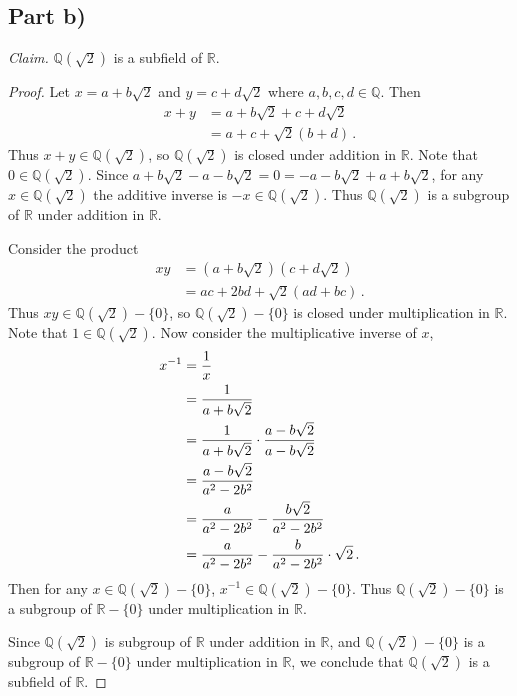\documentclass{abrice}
\newcommand{\R}{\mathbb{R}}
\newcommand{\Q}{\mathbb{Q}}
\begin{document}
\subsection{Part b)}

\emph{Claim.} $\Q(\sqrt 2)$ is a subfield of $\R$.

\begin{proof}
  Let $x = a + b \sqrt 2$ and $y = c + d \sqrt 2$ where $a,b,c,d \in \Q$. Then
  \begin{align*}
    x + y
    &= a + b \sqrt 2 + c + d \sqrt 2 \\
    &= a + c + \sqrt 2 (b + d)\, .
  \end{align*}
  Thus $x + y \in \Q(\sqrt 2)$, so $\Q(\sqrt 2)$ is closed under addition in
  $\R$. Note that $0 \in \Q(\sqrt 2)$. Since $a + b \sqrt 2 - a -b \sqrt 2 = 0 =
  -a - b \sqrt 2 + a + b \sqrt 2$, for any $x \in \Q(\sqrt 2)$ the additive
  inverse is $-x \in \Q(\sqrt 2)$. Thus $\Q(\sqrt 2)$ is a subgroup of $\R$
  under addition in $\R$.

  Consider the product
  \begin{align*}
    xy
    &= (a + b \sqrt 2)(c + d \sqrt 2) \\
    &= ac + 2bd + \sqrt 2 (ad + bc)\, .
  \end{align*}
  Thus $xy \in \Q(\sqrt 2) - \{0\}$, so $\Q(\sqrt 2) - \{0\}$ is closed under
  multiplication in $\R$. Note that $1 \in \Q(\sqrt 2)$. Now consider the
  multiplicative inverse of $x$,
  \begin{align*}
    x^{-1}
    &= {1 \over x} \\
    &= {1 \over a + b \sqrt 2} \\
    &= {1 \over a + b \sqrt 2} \cdot {a - b \sqrt 2 \over a - b \sqrt 2} \\
    &= {a - b \sqrt 2 \over a^2 - 2b^2} \\
    &= {a \over a^2 - 2b^2} - {b \sqrt 2 \over a^2 - 2b^2} \\
    &= {a \over a^2 - 2b^2} - {b \over a^2 - 2b^2} \cdot \sqrt 2\, .
  \end{align*}
  Then for any $x \in \Q(\sqrt 2) - \{0\}$, $x^{-1} \in \Q(\sqrt 2) - \{0\}$.
  Thus $\Q(\sqrt 2) - \{0\}$ is a subgroup of $\R - \{0\}$ under multiplication
  in $\R$.

  Since $\Q(\sqrt 2)$ is subgroup of $\R$ under addition in $\R$, and $\Q(\sqrt
  2) - \{0\}$ is a subgroup of $\R - \{0\}$ under multiplication in $\R$, we
  conclude that $\Q(\sqrt 2)$ is a subfield of $\R$.
\end{proof}
\end{document}
